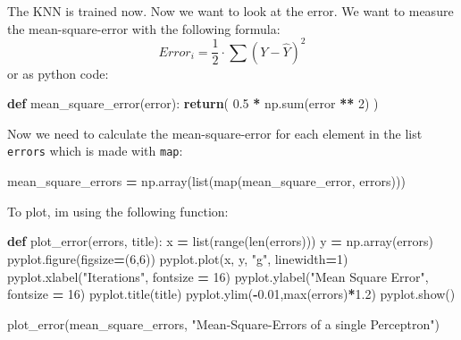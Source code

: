 \documentclass[
]{book}
\newenvironment{Shaded}{\begin{snugshade}}{\end{snugshade}}
\newcommand{\BuiltInTok}[1]{#1}
\newcommand{\ControlFlowTok}[1]{\textcolor[rgb]{0.13,0.29,0.53}{\textbf{#1}}}
\newcommand{\DecValTok}[1]{\textcolor[rgb]{0.00,0.00,0.81}{#1}}
\newcommand{\FloatTok}[1]{\textcolor[rgb]{0.00,0.00,0.81}{#1}}
\newcommand{\KeywordTok}[1]{\textcolor[rgb]{0.13,0.29,0.53}{\textbf{#1}}}
\newcommand{\NormalTok}[1]{#1}
\newcommand{\OperatorTok}[1]{\textcolor[rgb]{0.81,0.36,0.00}{\textbf{#1}}}
\newcommand{\StringTok}[1]{\textcolor[rgb]{0.31,0.60,0.02}{#1}}
\begin{document}
The KNN is trained now. Now we want to look at the error. We want to measure the mean-square-error with the following formula:
\[
  Error_i = \frac{1}{2} \cdot \sum(Y-\hat{Y})^2
\]
or as python code:

\begin{Shaded}
\begin{Highlighting}[]
\KeywordTok{def}\NormalTok{ mean\_square\_error(error):}
  \ControlFlowTok{return}\NormalTok{( }\FloatTok{0.5} \OperatorTok{*}\NormalTok{ np.}\BuiltInTok{sum}\NormalTok{(error }\OperatorTok{**} \DecValTok{2}\NormalTok{) )}
\end{Highlighting}
\end{Shaded}

Now we need to calculate the mean-square-error for each element in the list \texttt{errors} which is made with \texttt{map}:

\begin{Shaded}
\begin{Highlighting}[]
\NormalTok{mean\_square\_errors }\OperatorTok{=}\NormalTok{ np.array(}\BuiltInTok{list}\NormalTok{(}\BuiltInTok{map}\NormalTok{(mean\_square\_error, errors)))}
\end{Highlighting}
\end{Shaded}

To plot, im using the following function:

\begin{Shaded}
\begin{Highlighting}[]
\KeywordTok{def}\NormalTok{ plot\_error(errors, title):}
\NormalTok{  x }\OperatorTok{=} \BuiltInTok{list}\NormalTok{(}\BuiltInTok{range}\NormalTok{(}\BuiltInTok{len}\NormalTok{(errors)))}
\NormalTok{  y }\OperatorTok{=}\NormalTok{ np.array(errors)}
\NormalTok{  pyplot.figure(figsize}\OperatorTok{=}\NormalTok{(}\DecValTok{6}\NormalTok{,}\DecValTok{6}\NormalTok{))}
\NormalTok{  pyplot.plot(x, y, }\StringTok{"g"}\NormalTok{, linewidth}\OperatorTok{=}\DecValTok{1}\NormalTok{)}
\NormalTok{  pyplot.xlabel(}\StringTok{"Iterations"}\NormalTok{, fontsize }\OperatorTok{=} \DecValTok{16}\NormalTok{)}
\NormalTok{  pyplot.ylabel(}\StringTok{"Mean Square Error"}\NormalTok{, fontsize }\OperatorTok{=} \DecValTok{16}\NormalTok{)}
\NormalTok{  pyplot.title(title)}
\NormalTok{  pyplot.ylim(}\OperatorTok{{-}}\FloatTok{0.01}\NormalTok{,}\BuiltInTok{max}\NormalTok{(errors)}\OperatorTok{*}\FloatTok{1.2}\NormalTok{)}
\NormalTok{  pyplot.show()}
  
  
\NormalTok{plot\_error(mean\_square\_errors, }\StringTok{"Mean{-}Square{-}Errors of a single Perceptron"}\NormalTok{)}
\end{Highlighting}
\end{Shaded}
\end{document}
